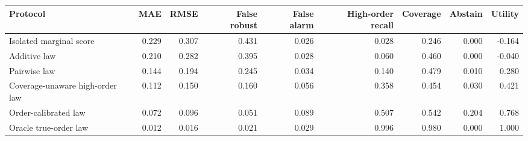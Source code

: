 \begin{tabular}{lrrrrrrrr}
\toprule
Protocol & MAE & RMSE & False robust & False alarm & High-order recall & Coverage & Abstain & Utility \\
\midrule
Isolated marginal score & 0.229 & 0.307 & 0.431 & 0.026 & 0.028 & 0.246 & 0.000 & -0.164 \\
Additive law & 0.210 & 0.282 & 0.395 & 0.028 & 0.060 & 0.460 & 0.000 & -0.040 \\
Pairwise law & 0.144 & 0.194 & 0.245 & 0.034 & 0.140 & 0.479 & 0.010 & 0.280 \\
Coverage-unaware high-order law & 0.112 & 0.150 & 0.160 & 0.056 & 0.358 & 0.454 & 0.030 & 0.421 \\
Order-calibrated law & 0.072 & 0.096 & 0.051 & 0.089 & 0.507 & 0.542 & 0.204 & 0.768 \\
Oracle true-order law & 0.012 & 0.016 & 0.021 & 0.029 & 0.996 & 0.980 & 0.000 & 1.000 \\
\bottomrule
\end{tabular}
